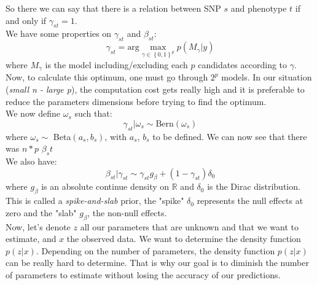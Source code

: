 So there we can say that there is a relation between SNP $s$ and phenotype $t$ if and only if $\gamma_{st} = 1$.\\
We have some properties on $\gamma_{st}$ and $\beta_{st}$:
\begin{equation}
\gamma_{st} = \text{arg} \max_{\gamma \in \left\lbrace0,1\right\rbrace^p}p(M_\gamma|y)
\end{equation}
where $M_\gamma$ is the model including/excluding each $p$ candidates according to $\gamma$. \\
Now, to calculate this optimum, one must go through $2^p$ models. In our situation (\textit{small n - large p}), the computation cost gets really high and it is preferable to reduce the parameters dimensions before trying to find the optimum.\\
\newline
We now define $\omega_s$ such that:
\begin{equation}
\gamma_{st} | \omega_s \sim \text{Bern}(\omega_s)
\label{eq:omega}
\end{equation}
where $\omega_s\sim $ Beta$(a_s,b_s)$, with $a_s$, $b_s$ to be defined. We can now see that there was $n*p$ $\beta_st$ \\
\newline
We also have:
\begin{equation}
\beta_{st} | \gamma_{st} \sim \gamma_{st} g_{\beta} + (1-\gamma_{st})\delta_0
\label{eq:spikenslab}
\end{equation}
where $g_{\beta}$ is an absolute continue density on $\mathbb{R}$ and $\delta_0$ is the Dirac distribution.\\
\newline
This is called a \textit{spike-and-slab} prior, the "spike" $\delta_0$ represents the null effects at zero and the "slab" $g_{\beta}$, the non-null effects.\\
\newline
Now, let's denote $z$ all our parameters that are unknown and that we want to estimate, and $x$ the observed data. We want to determine the density function $p(z|x)$. Depending on the number of parameters, the density function $p(z|x)$ can be really hard to determine. That is why our goal is to diminish the number of parameters to estimate without losing the accuracy of our predictions.